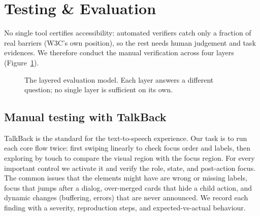 \section{Testing \& Evaluation}
\label{sec:test}

No single tool certifies accessibility: automated verifiers catch only a fraction of real barriers
(W3C's own position), so the rest needs human judgement and task evidences. We therefore
conduct the manual verification across four layers (Figure~\ref{fig:layers}).


\begin{figure}[h]
	\centering
	\caption{The layered evaluation model. Each layer answers a different question; no single layer is
		sufficient on its own.}
	\label{fig:layers}
\end{figure}

\subsection{Manual testing with TalkBack}

TalkBack is the standard for the text-to-speech experience. Our task is to run each core flow twice:
first swiping linearly to check focus order and labels, then exploring by touch to compare the visual
region with the focus region. For every important control we activate it and verify the role, state,
and post-action focus. The common issues that the elements might have are wrong or missing labels, focus that jumps after a dialog, over-merged cards that hide a child
action, and dynamic changes (buffering, errors) that are never announced. We record each finding with
a severity, reproduction steps, and expected-vs-actual behaviour.


